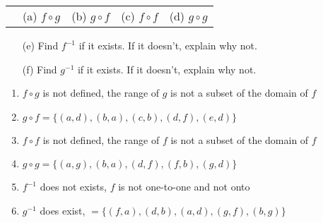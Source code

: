 \begin{questions}
\begin{tabular}{p{0.5in}llll}
  & (a) $f \circ g$ \hspace{0.3in} & (b) $g \circ f$ \hspace{0.3in} & (c) $f
\circ f$ \hspace{0.3in} & (d) $g \circ g$
\end{tabular}
\begin{itemize}[itemsep=0pt,parsep=0pt,topsep=0pt,partopsep=0pt]
    \item[(e)] Find $f^{-1}$ if it exists. If it doesn't, explain why not.
    \item[(f)] Find $g^{-1}$ if it exists. If it doesn't, explain why not.
\end{itemize}
   \ifprintanswers
        \vspace{-5pt}
   \fi
	\begin{solution}
	\begin{enumerate}[label=(\alph*),itemsep=3pt,parsep=0pt,topsep=0pt,partopsep=0pt]
		\item $f \circ g$ is not defined, the range of $g$ is not a subset of the domain of $f$
		\item $g \circ f = \{ (a,d), (b,a), (c,b), (d,f), (e,d) \}$
		\item $f \circ f$ is not defined, the range of $f$ is not a subset of the domain of $f$
		\item $g \circ g = \{ (a,g), (b,a), (d,f), (f,b), (g,d) \}$
		\item $f^{-1}$ does not exists, $f$ is not one-to-one and not onto
		\item $g^{-1}$ does exist, $= \{ (f,a), (d,b), (a,d), (g,f), (b,g) \}$
	\end{enumerate}
	\end{solution}




\end{questions}
